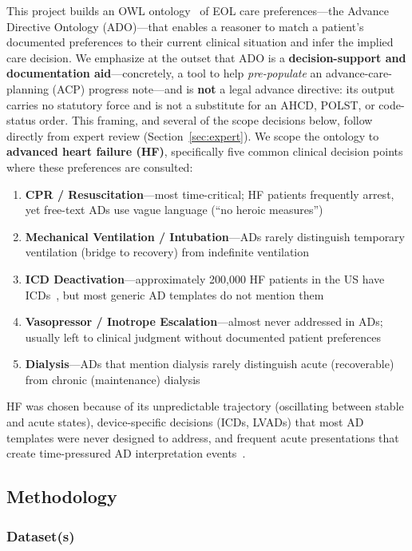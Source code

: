\documentclass[11pt]{article}
\begin{document}
This project builds an OWL ontology~\cite{owl2primer} of EOL care preferences---the Advance Directive Ontology (ADO)---that enables a reasoner to match a patient's documented preferences to their current clinical situation and infer the implied care decision. We emphasize at the outset that ADO is a \textbf{decision-support and documentation aid}---concretely, a tool to help \emph{pre-populate} an advance-care-planning (ACP) progress note---and is \textbf{not} a legal advance directive: its output carries no statutory force and is not a substitute for an AHCD, POLST, or code-status order. This framing, and several of the scope decisions below, follow directly from expert review (Section~\ref{sec:expert}). We scope the ontology to \textbf{advanced heart failure (HF)}, specifically five common clinical decision points where these preferences are consulted:

\begin{enumerate}[nosep]
    \item \textbf{CPR / Resuscitation}---most time-critical; HF patients frequently arrest, yet free-text ADs use vague language (``no heroic measures'')
    \item \textbf{Mechanical Ventilation / Intubation}---ADs rarely distinguish temporary ventilation (bridge to recovery) from indefinite ventilation
    \item \textbf{ICD Deactivation}---approximately 200,000 HF patients in the US have ICDs~\cite{kremers2023}, but most generic AD templates do not mention them
    \item \textbf{Vasopressor / Inotrope Escalation}---almost never addressed in ADs; usually left to clinical judgment without documented patient preferences
    \item \textbf{Dialysis}---ADs that mention dialysis rarely distinguish acute (recoverable) from chronic (maintenance) dialysis
\end{enumerate}

HF was chosen because of its unpredictable trajectory (oscillating between stable and acute states), device-specific decisions (ICDs, LVADs) that most AD templates were never designed to address, and frequent acute presentations that create time-pressured AD interpretation events~\cite{allen2012}.

\subsection{Methodology}

\subsubsection{Dataset(s)}
\end{document}

